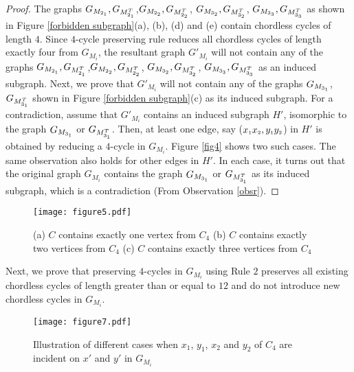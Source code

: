 \documentclass[review, 1p]{elsarticle}
\begin{document}
\begin{proof}
The graphs $G_{ \tiny M_{2_{1}}}, G_{ \tiny M_{2_{1}}^{\tiny T}}$,$G_{ \tiny M_{2_{2}}},G_{ \tiny M_{2_{2}}^{\tiny T}}$, $G_{ \tiny M_{3_{2}}},G_{ \tiny M_{3_{2}}^{\tiny T}}$, $G_{ \tiny M_{3_{3}}},G_{ \tiny M_{3_{3}}^{\tiny T}}$ as shown in Figure \ref{forbidden subgraph}(a), (b), (d) and (e) contain chordless cycles of length $4$. Since $4$-cycle preserving rule reduces all chordless cycles of length exactly four from $G_{M_{i}}$, the resultant graph $G'_{M_{i}}$ will not contain any of the graphs $G_{ \tiny M_{2_{1}}}, G_{ \tiny M_{2_{1}}^{\tiny T}}$,$G_{ \tiny M_{2_{2}}},G_{ \tiny M_{2_{2}}^{\tiny T}}$, $G_{ \tiny M_{3_{2}}},G_{ \tiny M_{3_{2}}^{\tiny T}}$, $G_{ \tiny M_{3_{3}}},G_{ \tiny M_{3_{3}}^{\tiny T}}$ as an induced subgraph. Next, we prove that $G'_{M_{i}}$ will not contain any of the graphs $G_{ \tiny M_{3_{1}}}$, $G_{ \tiny M_{3_{1}}^{\tiny T}}$ shown in Figure \ref{forbidden subgraph}(c) as its induced subgraph. For a contradiction, assume that $G'_{M_{i}}$ contains an induced subgraph $H'$, isomorphic to the graph $G_{ \tiny M_{3_{1}}}$ or $G_{ \tiny M_{3_{1}}^{\tiny T}}$. Then, at least one edge, say ($x_{\mathsmaller 1}x_{\mathsmaller 2},y_{\mathsmaller 1}y_{\mathsmaller 2}$) in $H'$ is obtained by reducing a $4$-cycle in $G_{M_{i}}$. Figure \ref{fig4} shows two such cases. The same observation also holds for other edges in $H'$. In each case, it turns out that the original graph $G_{M_{i}}$ contains the graph $G_{ \tiny M_{3_{1}}}$ or $G_{ \tiny M_{3_{1}}^{\tiny T}}$ as its induced subgraph, which is a contradiction (From Observation \ref{obsr}). 
\end{proof}
\begin{figure}[h]
 \begin{center} \texttt{[image: figure5.pdf]}
 \end{center}
  \caption{(a) $C$ contains exactly one vertex from $C_{4}$ (b) $C$ contains exactly two vertices from $C_{4}$ (c) $C$ contains exactly three vertices from $C_{4}$ }
  \label{case 1}
\end{figure}
\noindent Next, we prove that preserving $4$-cycles in $G_{M_{i}}$ using Rule $2$ preserves all existing chordless cycles  of length greater than or equal to $12$ and do not introduce new chordless cycles in $G_{M_{i}}$.
  \begin{figure}[h]
 \begin{center} \texttt{[image: figure7.pdf]}
 \end{center}
  \caption{Illustration of different cases when $x_{1}$, $y_{1}$, $x_{2}$ and $y_{2}$ of $C_{4}$ are incident on $x'$ and $y'$ in $G_{M_{i}}$}
  \label{case2}
\end{figure}
\end{document}
